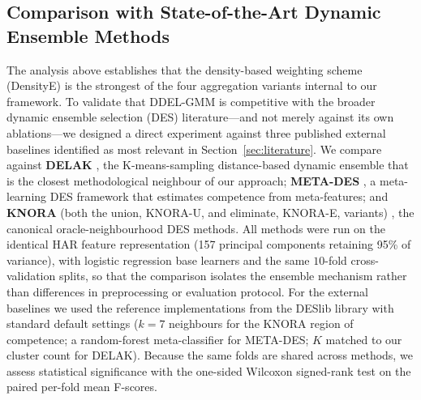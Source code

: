 \documentclass[lettersize,journal]{IEEEtran}
\newcommand{\tfourhighlight}{\color{tier4blue}}
\begin{document}
	{\tfourhighlight
\subsection{Comparison with State-of-the-Art Dynamic Ensemble Methods}
	
	\noindent The analysis above establishes that the density-based weighting scheme (DensityE) is the strongest of the four aggregation variants internal to our framework. To validate that DDEL-GMM is competitive with the broader dynamic ensemble selection (DES) literature—and not merely against its own ablations—we designed a direct experiment against three published external baselines identified as most relevant in Section~\ref{sec:literature}. We compare against \textbf{DELAK} \cite{guo_dynamic_2021}, the K-means-sampling distance-based dynamic ensemble that is the closest methodological neighbour of our approach; \textbf{META-DES} \cite{cruz_meta-oracle_2017}, a meta-learning DES framework that estimates competence from meta-features; and \textbf{KNORA} (both the union, KNORA-U, and eliminate, KNORA-E, variants) \cite{ko_dynamic_2008}, the canonical oracle-neighbourhood DES methods. All methods were run on the identical HAR feature representation (157 principal components retaining 95\% of variance), with logistic regression base learners and the same $10$-fold cross-validation splits, so that the comparison isolates the ensemble mechanism rather than differences in preprocessing or evaluation protocol. For the external baselines we used the reference implementations from the DESlib library with standard default settings ($k=7$ neighbours for the KNORA region of competence; a random-forest meta-classifier for META-DES; $K$ matched to our cluster count for DELAK). Because the same folds are shared across methods, we assess statistical significance with the one-sided Wilcoxon signed-rank test on the paired per-fold mean F-scores.
	
}
\end{document}
